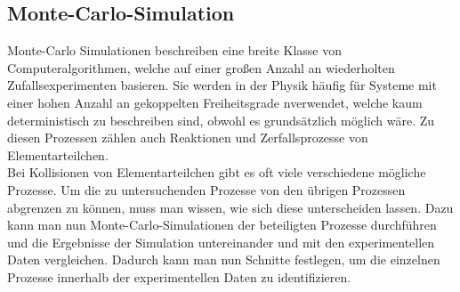 \subsection{Monte-Carlo-Simulation}
\label{sec:montecarlo}

Monte-Carlo Simulationen beschreiben eine breite Klasse von Computeralgorithmen, welche auf einer großen Anzahl an wiederholten Zufallsexperimenten basieren. Sie werden in der Physik häufig für Systeme mit einer hohen Anzahl an gekoppelten Freiheitsgrade nverwendet, welche kaum deterministisch zu beschreiben sind, obwohl es grundsätzlich möglich wäre. Zu diesen Prozessen zählen auch Reaktionen und Zerfallsprozesse von Elementarteilchen.\\

Bei Kollisionen von Elementarteilchen gibt es oft viele verschiedene mögliche Prozesse. Um die zu untersuchenden Prozesse von den übrigen Prozessen abgrenzen zu können, muss man wissen, wie sich diese unterscheiden lassen. Dazu kann man nun Monte-Carlo-Simulationen der beteiligten Prozesse durchführen und die Ergebnisse der Simulation untereinander und mit den experimentellen Daten vergleichen. Dadurch kann man nun Schnitte festlegen, um die einzelnen Prozesse innerhalb der experimentellen Daten zu identifizieren. \cite{mc}


